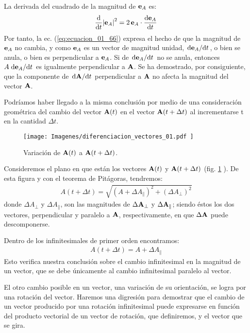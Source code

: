 \par
La derivada del cuadrado de la magnitud de $\vb{e}_{A}$ es:
\begin{align*}
    \dv{t} \abs{\vb{e}_{A}}^{2} = 2 \, \vb{e}_{A} \cdot \dv{\vb{e}_{A}}{t}
\end{align*}
Por tanto, la ec. (\ref{eq:ecuacion_01_66}) expresa el hecho de que la magnitud de $\vb{e}_{A}$ no cambia, y como $\vb{e}_{A}$ es un vector de magnitud unidad, $\dv*{\vb{e}_{A}}{t}$, o bien se anula, o bien es perpendicular a $\vb{e}_{A}$. Si de $\dv*{\vb{e}_{A}}{t}$ no se anula, entonces $A \dv*{\vb{e}_{A}}{t}$ es igualmente perpendicular a $\vb{A}$. Se ha demostrado, por consiguiente, que la componente de $\dv*{\vb{A}}{t}$ perpendicular a $\vb{A}$ no afecta la magnitud del vector $\vb{A}$. 
\par
Podríamos haber llegado a la misma conclusión por medio de una consideración geométrica del cambio del vector $\vb{A} (t)$ en el vector $\vb{A} (t + \Delta t)$ al incrementarse t en la cantidad $\Delta t$. 
\begin{figure}[H]
    \centering
    \texttt{[image: Imagenes/diferenciacion\_vectores\_01.pdf   ]}
    \caption{Variación de $\vb{A} (t)$  a $\vb{A} (t + \Delta t)$.}
    \label{fig:figura_01_19}
\end{figure}
Consideremos el plano en que están los vectores $\vb{A} (t)$ y $\vb{A} (t + \Delta t)$ (fig. \ref{fig:figura_01_19} ). De esta figura y con el teorema de Pitágoras, tendremos:
\begin{align*}
    A (t + \Delta t) = \sqrt{ \left( A + \Delta A_{\parallel} \right)^{2} + \left( \Delta A_{\perp} \right)^{2} }
\end{align*}
donde $\Delta A_{\perp}$ y $\Delta A_{\parallel}$, son las magnitudes de $\Delta \vb{A}_{\perp}$ y $\Delta \vb{A}_{\parallel}$; siendo éstos los dos vectores, perpendicular y paralelo a $\vb{A}$, respectivamente, en que $\Delta \vb{A}$ puede descomponerse. 
\par
Dentro de los infinitesimales de primer orden encontramos:
\begin{align*}
    A \left( t + \Delta t \right) = A + \Delta A_{\parallel}
\end{align*}
Esto verifica nuestra conclusión sobre el cambio infinitesimal en la magnitud de un vector, que se debe únicamente al cambio infinitesimal paralelo al vector. 
\par
El otro cambio posible en un vector, una variación de su orientación, se logra por una rotación del vector. Haremos una digresión para demostrar que el cambio de un vector producido por una rotación infinitesimal puede expresarse en función del producto vectorial de un vector de rotación, que definiremos, y el vector que se gira. 

